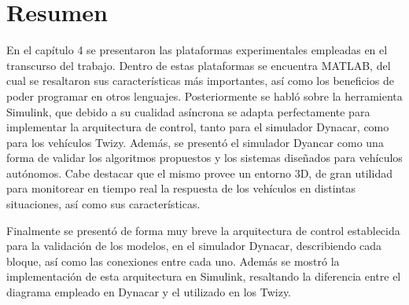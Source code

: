 \section{Resumen}
En el capítulo 4 se presentaron las plataformas experimentales empleadas en el transcurso del trabajo. Dentro de estas plataformas se encuentra MATLAB, del cual se resaltaron sus características más importantes, así como los beneficios de poder programar en otros lenguajes. Posteriormente se habló sobre la herramienta Simulink, que debido a su cualidad asíncrona se adapta perfectamente para implementar la arquitectura de control, tanto para el simulador Dynacar, como para los vehículos Twizy. Además, se presentó el simulador Dyancar como una forma de validar los algoritmos propuestos y los sistemas diseñados para vehículos autónomos. Cabe destacar que el mismo provee un entorno 3D, de gran utilidad para monitorear en tiempo real la respuesta de los vehículos en distintas situaciones, así como sus características.\\
\par Finalmente se presentó de forma muy breve la arquitectura de control establecida para la validación de los modelos, en el simulador Dynacar, describiendo cada bloque, así como las conexiones entre cada uno. Además se mostró la implementación de esta arquitectura en Simulink, resaltando la diferencia entre el diagrama empleado en Dynacar y el utilizado en los Twizy.     

